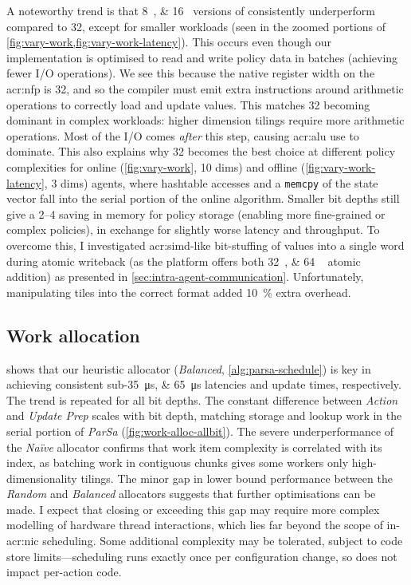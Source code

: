 A noteworthy trend is that \qtylist{8;16}{\bit} versions of \approachshort{} consistently underperform compared to \qty{32}{\bit}, except for smaller workloads (seen in the zoomed portions of \cref{fig:vary-work,fig:vary-work-latency}).
This occurs even though our implementation is optimised to read and write policy data in batches (achieving fewer I/O operations).
We see this because the native register width on the \gls{acr:nfp} is \qty{32}{\bit}, and so the compiler must emit extra instructions around arithmetic operations to correctly load and update values.
This matches \qty{32}{\bit} becoming dominant in complex workloads: higher dimension tilings require more arithmetic operations.
Most of the I/O comes \emph{after} this step, causing \gls{acr:alu} use to dominate.
This also explains why \qty{32}{\bit} becomes the best choice at different policy complexities for online (\cref{fig:vary-work}, 10 dims) and offline (\cref{fig:vary-work-latency}, 3 dims) agents, where hashtable accesses and a \texttt{memcpy} of the state vector fall into the serial portion of the online algorithm.
Smaller bit depths still give a \qtyrange{2}{4}{\times} saving in memory for policy storage (enabling more fine-grained or complex policies), in exchange for slightly worse latency and throughput.
To overcome this, I investigated \gls{acr:simd}-like bit-stuffing of values into a single word during atomic writeback (as the platform offers both \qtylist{32;64
}{\bit} atomic addition) as presented in \cref{sec:intra-agent-communication}.
Unfortunately, manipulating tiles into the correct format added \qty{10}{\percent} extra overhead.

\subsection{Work allocation}\label{sec:opal-results-work-alloc}
 shows that our heuristic allocator (\emph{Balanced}, \cref{alg:parsa-schedule}) is key in achieving consistent sub-\qtylist{35;65}{\micro\second} latencies and update times, respectively.
The trend is repeated for all bit depths.
The constant difference between \emph{Action} and \emph{Update Prep} scales with bit depth, matching storage and lookup work in the serial portion of \emph{ParSa} (\cref{fig:work-alloc-allbit}).
The severe underperformance of the \emph{Na\"{i}ve} allocator confirms that work item complexity is correlated with its index, as batching work in contiguous chunks gives some workers only high-dimensionality tilings.
The minor gap in lower bound performance between the \emph{Random} and \emph{Balanced} allocators suggests that further optimisations can be made.
I expect that closing or exceeding this gap may require more complex modelling of hardware thread interactions, which lies far beyond the scope of in-\gls{acr:nic} scheduling.
Some additional complexity may be tolerated, subject to code store limits---scheduling runs exactly once per configuration change, so does not impact per-action code.

